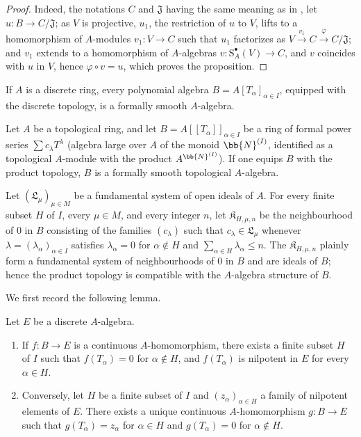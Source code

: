 \begin{proof}
Indeed, the notations $C$ and $\mathfrak{J}$ having the same meaning as in , let $u:B\to C/\mathfrak{J}$;
as $V$ is projective, $u_1$, the restriction of $u$ to $V$, lifts to a homomorphism of $A$-modules $v_1:V\to C$ such that $u_1$ factorizes as $V\xrightarrow{v_1}C\xrightarrow{\varphi}C/\mathfrak{J}$;
and $v_1$ extends to a homomorphism of $A$-algebras $v:\mathrm{S}_A^\bullet(V)\to C$, and $v$ coincides with $u$ in $V$, hence $\varphi\circ v=u$, which proves the proposition.
\end{proof}

\begin{corollary}[19.3.3]
\label{0.19.3.3}
If $A$ is a discrete ring, every polynomial algebra $B=A[T_\alpha]_{\alpha\in I}$, equipped with the discrete topology, is a formally smooth $A$-algebra.
\end{corollary}

\begin{proposition}[19.3.4]
\label{0.19.3.4}
Let $A$ be a topological ring, and let $B=A[[T_\alpha]]_{\alpha\in I}$ be a ring of formal power series $\sum c_\lambda T^\lambda$ (algebra large over $A$ of the monoid $\bb{N}^{(I)}$, identified as a topological $A$-module with the product $A^{\bb{N}^{(I)}}$).
If one equips $B$ with the product topology, $B$ is a formally smooth topological $A$-algebra.
\end{proposition}

Let $(\mathfrak{L}_\mu)_{\mu\in M}$ be a fundamental system of open ideals of $A$.
For every finite subset $H$ of $I$, every $\mu\in M$, and every integer $n$, let $\mathfrak{K}_{H,\mu,n}$ be the neighbourhood of $0$ in $B$ consisting of the families $(c_\lambda)$ such that $c_\lambda\in\mathfrak{L}_\mu$ whenever $\lambda=(\lambda_\alpha)_{\alpha\in I}$ satisfies $\lambda_\alpha=0$ for $\alpha\notin H$ and $\sum_{\alpha\in H}\lambda_\alpha\leq n$.
The $\mathfrak{K}_{H,\mu,n}$ plainly form a fundamental system of neighbourhoods of $0$ in $B$ and are ideals of $B$; hence the product topology is compatible with the $A$-algebra structure of $B$.

We first record the following lemma.

\begin{lemma}[19.3.4.1]
\label{0.19.3.4.1}
Let $E$ be a discrete $A$-algebra.
\begin{enumerate}
  \item[\rm(i)] If $f:B\to E$ is a continuous $A$-homomorphism, there exists a finite subset $H$ of $I$ such that $f(T_\alpha)=0$ for $\alpha\notin H$, and $f(T_\alpha)$ is nilpotent in $E$ for every $\alpha\in H$.
  \item[\rm(ii)] Conversely, let $H$ be a finite subset of $I$ and $(z_\alpha)_{\alpha\in H}$ a family of nilpotent elements of $E$.
  There exists a unique continuous $A$-homomorphism $g:B\to E$ such that $g(T_\alpha)=z_\alpha$ for $\alpha\in H$ and $g(T_\alpha)=0$ for $\alpha\notin H$.
\end{enumerate}
\end{lemma}


